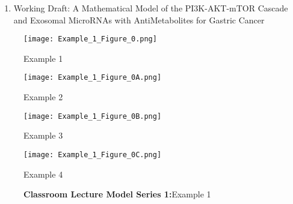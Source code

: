 \documentclass{ResumeDesignFormat1}
\begin{document}
\begin{enumerate}
\item Working Draft: A Mathematical Model of the PI3K-AKT-mTOR Cascade and Exosomal MicroRNAs with AntiMetabolites for Gastric Cancer
\end{enumerate}
\footnotesize
\begin{figure}[h]
	\centering
	\begin{minipage}[b]{0.5\linewidth}
		\texttt{[image: Example\_1\_Figure\_0.png]}
		\caption{\footnotesize Example 1 }
		\label{fig:FigureA}
	\end{minipage}\hfill
	\begin{minipage}[b]{0.5\linewidth}
		\texttt{[image: Example\_1\_Figure\_0A.png]}
		\caption{\footnotesize Example 2}
		\label{fig:FigureB}
	\end{minipage}\hfill
	\begin{minipage}[b]{0.5\linewidth}
		\texttt{[image: Example\_1\_Figure\_0B.png]}
		\caption{\footnotesize Example 3}
		\label{fig:FigureC}
	\end{minipage}\hfill
	\begin{minipage}[b]{0.5\linewidth}
		\texttt{[image: Example\_1\_Figure\_0C.png]}
		\caption{\footnotesize Example 4}
		\label{fig:FigureD}
	\end{minipage}\hfill
	\caption{\textcolor{c5}{\textbf{Classroom Lecture Model Series 1:}}\footnotesize Example 1 }
	\label{fig:Figure1}
\end{figure}
\end{document}
